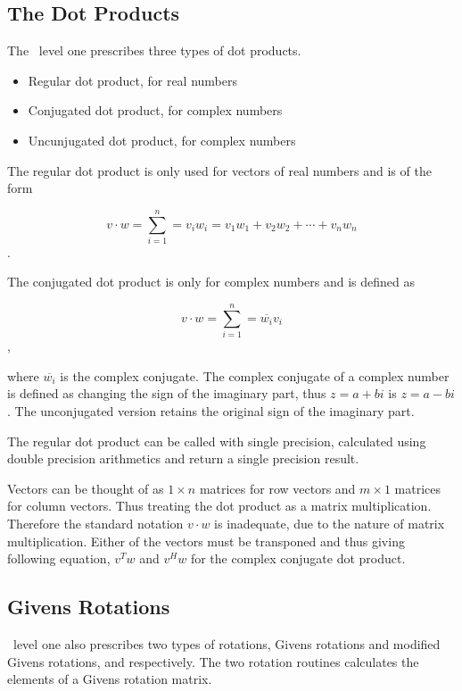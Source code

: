 
\subsection{The Dot Products}

The \BLAS\ level one prescribes three types of dot products.

\begin{itemize}
\item{Regular dot product, for real numbers}
\item{Conjugated dot product, for complex numbers}
\item{Uncunjugated dot product, for complex numbers}
\end{itemize}

The regular dot product is only used for vectors of real numbers and
is of the form

\[v \cdot w = \sum_{i=1}^n = v_i w_i = v_1 w_1 + v_2 w_2 + \cdots + v_n w_n \].

The conjugated dot product is only for complex numbers and is defined as

\[v \cdot w = \sum_{i=1}^n = \overline{w_i} v_i \],

where $\overline{w_i}$ is the complex conjugate. The complex conjugate
of a complex number is defined as changing the sign of the imaginary
part, thus $z = a + bi$ is $z = a - bi$. The unconjugated version
retains the original sign of the imaginary part.

The regular dot product can be called with single precision,
calculated using double precision arithmetics and return a single
precision result.

Vectors can be thought of as $1 \times n$ matrices for row vectors and
$m \times 1$ matrices for column vectors. Thus treating the dot
product as a matrix multiplication. Therefore the standard notation
$v \cdot w$ is inadequate, due to the nature of matrix
multiplication. Either of the vectors must be transponed and thus
giving following equation, $v^T w$ and $v^H w$ for the complex
conjugate dot product.

\subsection{Givens Rotations}

\BLAS\ level one also prescribes two types of rotations, Givens
rotations and modified Givens rotations, 
and  respectively. The two rotation routines
calculates the elements of a Givens rotation matrix.

